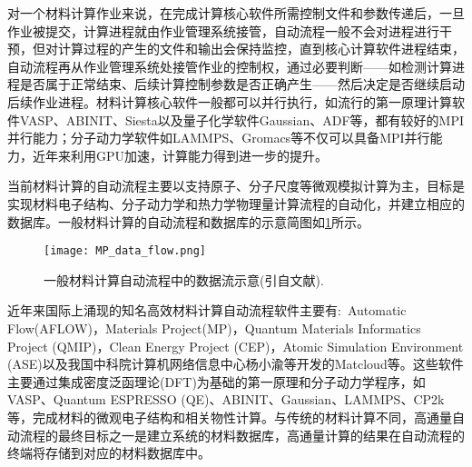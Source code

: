 对一个材料计算作业来说，在完成计算核心软件所需控制文件和参数传递后，一旦作业被提交，计算进程就由作业管理系统接管，自动流程一般不会对进程进行干预，但对计算过程的产生的文件和输出会保持监控，直到核心计算软件进程结束，自动流程再从作业管理系统处接管作业的控制权，通过必要判断——如检测计算进程是否属于正常结束、后续计算控制参数是否正确产生——然后决定是否继续启动后续作业进程。材料计算核心软件一般都可以并行执行，如流行的第一原理计算软件\textrm{VASP}、\textrm{ABINIT}、\textrm{Siesta}以及量子化学软件\textrm{Gaussian}、\textrm{ADF}等，都有较好的\textrm{MPI}并行能力；分子动力学软件如\textrm{LAMMPS}、\textrm{Gromacs}等不仅可以具备\textrm{MPI}并行能力，近年来利用\textrm{GPU}加速，计算能力得到进一步的提升。

当前材料计算的自动流程主要以支持原子、分子尺度等微观模拟计算为主，目标是实现材料电子结构、分子动力学和热力学物理量计算流程的自动化，并建立相应的数据库。一般材料计算的自动流程和数据库的示意简图如\ref{Fig:MP_data_flow}所示。
\begin{figure}[h!]
\centering
\texttt{[image: MP\_data\_flow.png]}%
\caption{一般材料计算自动流程中的数据流示意(引自文献).}%
\label{Fig:MP_data_flow}
\end{figure}

近年来国际上涌现的知名高效材料计算自动流程软件主要有:~\textrm{Automatic Flow(AFLOW)}，\textrm{Materials Project(MP)}，\textrm{Quantum Materials Informatics Project (QMIP)}，\textrm{Clean Energy Project (CEP)}，\textrm{Atomic Simulation Environment (ASE)}以及我国中科院计算机网络信息中心杨小渝等开发的\textrm{Matcloud}等。这些软件主要通过集成密度泛函理论\textrm{(DFT)}为基础的第一原理和分子动力学程序，如\textrm{VASP}、\textrm{Quantum ESPRESSO (QE)}、\textrm{ABINIT}、\textrm{Gaussian}、\textrm{LAMMPS}、\textrm{CP2k}等，完成材料的微观电子结构和相关物性计算。与传统的材料计算不同，高通量自动流程的最终目标之一是建立系统的材料数据库，高通量计算的结果在自动流程的终端将存储到对应的材料数据库中。


